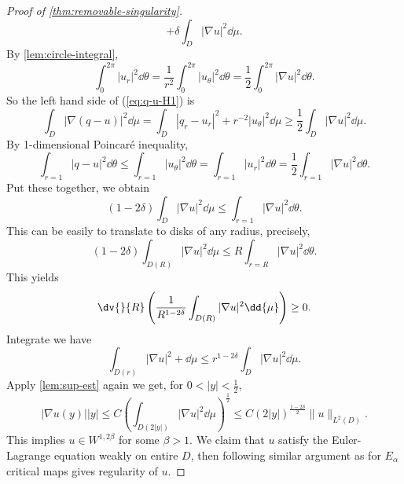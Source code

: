 \documentclass[UTF8,12pt]{article}
\theoremstyle{plain}\newtheorem{theorem}{Theorem}
\theoremstyle{definition}\newtheorem{definition}[theorem]{Definition}
\theoremstyle{definition}\newtheorem{example}[theorem]{Example}
\theoremstyle{plain}\newtheorem{axiom}[theorem]{Axiom}
\theoremstyle{plain}\newtheorem{assertion}[theorem]{Assertion}
\theoremstyle{plain}\newtheorem{corollary}[theorem]{Corollary}
\theoremstyle{plain}\newtheorem{lemma}[theorem]{Lemma}
\theoremstyle{plain}\newtheorem{proposition}[theorem]{Proposition}
\theoremstyle{plain}\newtheorem{prop}[theorem]{Proposition}
\theoremstyle{plain}\newtheorem{conjecture}[theorem]{Conjecture}
\theoremstyle{plain}\newtheorem{conj}[theorem]{Conjecture}
\theoremstyle{plain}\newtheorem{problem}[theorem]{Problem}
\theoremstyle{remark}\newtheorem{notation}[theorem]{Notation}
\theoremstyle{definition}\newtheorem*{question}{Question}
\theoremstyle{definition}\newtheorem*{answer}{Answer}
\theoremstyle{definition}\newtheorem*{goal}{Goal}
\theoremstyle{plain}\newtheorem*{application}{Application}
\theoremstyle{plain}\newtheorem*{exercise}{Exercise}
\theoremstyle{remark}\newtheorem*{remark}{Remark}
\theoremstyle{remark}\newtheorem*{note}{\small{Note}}
\numberwithin{equation}{section}
\numberwithin{theorem}{section}
\numberwithin{figure}{section}
\begin{document}
\begin{proof}[Proof of \cref{thm:removable-singularity}]
\begin{equation}
        +\delta \int_{D}|\nabla u|^2\dd{\mu}
    .\end{equation}
    By \cref{lem:circle-integral}, \[
        \int_{0}^{2\pi}|u_r|^2\dd{\theta}
        =\frac{1}{r^2}\int_{0}^{2\pi}|u_\theta|^2\dd{\theta}
        =\frac{1}{2}\int_{0}^{2\pi}|\nabla u|^2\dd{\theta}
    .\] So the left hand side of (\ref{eq:q-u-H1}) is \[
        \int_{D}|\nabla (q-u)|^2\dd{\mu}
        =\int_{D}|q_r-u_r|^2+r^{-2}|u_\theta|^2\dd{\mu}
        \ge \frac{1}{2}\int_{D}|\nabla u|^2\dd{\mu}
    .\] By 1-dimensional Poincaré inequality, \[
        \int_{r=1}|q-u|^2\dd{\theta}\le \int_{r=1}|u_\theta|^2\dd{\theta}
        =\int_{r=1}|u_r|^2\dd{\theta}=\frac{1}{2}\int_{r=1}|\nabla u|^2\dd{\theta}
    .\] Put these together, we obtain \[
        (1-2\delta)\int_{D}|\nabla u|^2\dd{\mu}\le \int_{r=1}|\nabla u|^2\dd{\theta}
    .\] This can be easily to translate to disks of any radius, precisely, \[
        (1-2\delta)\int_{D(R)}|\nabla u|^2\dd{\mu}
        \le R\int_{r=R}|\nabla u|^2\dd{\theta}
    .\] This yields \[
        \dv{}{R}\left(\frac{1}{R^{1-2\delta}}\int_{D(R)}|\nabla u|^2\dd{\mu}\right)\ge 0
    .\] Integrate we have \[
        \int_{D(r)}|\nabla u|^2+\dd{\mu}\le r^{1-2\delta}\int_{D}|\nabla u|^2\dd{\mu}
    .\] Apply \cref{lem:sup-est} again we get, for \(0<|y|<\frac{1}{2}\), \[
        |\nabla u(y)||y|
        \le C\left(\int_{D(2|y|)}|\nabla u|^2\dd{\mu}\right)^{\frac{1}{2}}
        \le C(2|y|)^{\frac{1-2\delta}{2}}\|u\|_{L^2(D)}
    .\] This implies \(u\in W^{1,2\beta}\) for some \(\beta>1\).
    We claim that \(u\) satisfy the Euler-Lagrange equation weakly on entire \(D\),
    then following similar argument as for \(E_\alpha\) critical maps gives
    regularity of \(u\).
\end{proof}
\end{document}
